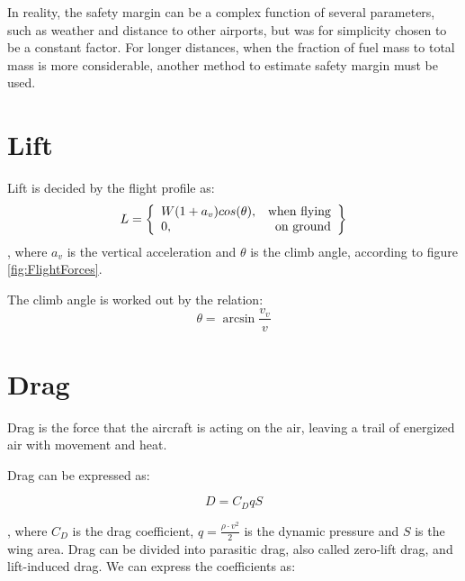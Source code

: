 \documentclass[english]{kththesis}
\begin{document}
In reality, the safety margin can be a complex function of several parameters, such as weather and distance to other airports, but was for simplicity chosen to be a constant factor. For longer distances, when the fraction of fuel mass to total mass is more considerable, another method to estimate safety margin must be used.

\section{Lift}
\label{sec:lift}
Lift is decided by the flight profile as:
\begin{equation}
\label{eq:Lift}
 L = \left\{\begin{array}{l r}
        W(1+a_v)cos(\theta) , & \text{when flying}\\
        0, & \text{on ground}
        \end{array}\right\}
\end{equation}
, where $a_v$ is the vertical acceleration and $\theta$ is the climb angle, according to figure \ref{fig:FlightForces}.

The climb angle is worked out by the relation:
\begin{equation}
\label{eq:Theta}
 \theta = \arcsin \frac{v_v}{v}
\end{equation}

\section{Drag}
\label{sec:drag}
Drag is the force that the aircraft is acting on the air, leaving a trail of energized air with movement and heat.

Drag can be expressed as:
 
\begin{equation}
\label{eq:Drag}
D = C_D q S
\end{equation}

, where $C_D$ is the drag coefficient, $q=\frac{\rho\cdot v^2}{2}$ is the dynamic pressure and $S$ is the wing area. Drag can be divided into parasitic drag, also called zero-lift drag, and lift-induced drag. We can express the coefficients as:
\end{document}
